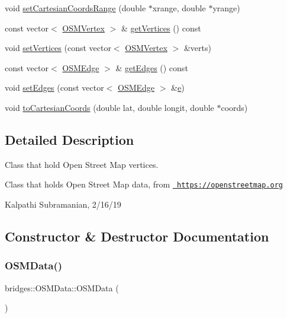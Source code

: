 \begin{DoxyCompactItemize}
\item 
void \mbox{\hyperlink{classbridges_1_1_o_s_m_data_ab61b84e459e01baa7f2c00da47ff4ccf}{set\+Cartesian\+Coords\+Range}} (double $\ast$xrange, double $\ast$yrange)
\item 
const vector$<$ \mbox{\hyperlink{classbridges_1_1_o_s_m_vertex}{O\+S\+M\+Vertex}} $>$ \& \mbox{\hyperlink{classbridges_1_1_o_s_m_data_a2f8fd5e4d3d0252ae7afae32f9ccc4fa}{get\+Vertices}} () const
\item 
void \mbox{\hyperlink{classbridges_1_1_o_s_m_data_aafb30f3266813b4ad8526312d4914f91}{set\+Vertices}} (const vector$<$ \mbox{\hyperlink{classbridges_1_1_o_s_m_vertex}{O\+S\+M\+Vertex}} $>$ \&verts)
\item 
const vector$<$ \mbox{\hyperlink{classbridges_1_1_o_s_m_edge}{O\+S\+M\+Edge}} $>$ \& \mbox{\hyperlink{classbridges_1_1_o_s_m_data_a0a226c840f69547f5d4e53dd7d4ef5d3}{get\+Edges}} () const
\item 
void \mbox{\hyperlink{classbridges_1_1_o_s_m_data_a3448ae401b5c5253262cc9c386dba1a9}{set\+Edges}} (const vector$<$ \mbox{\hyperlink{classbridges_1_1_o_s_m_edge}{O\+S\+M\+Edge}} $>$ \&\mbox{\hyperlink{namespacebridges_acfb0a4f7877d8f63de3e6862004c50edae1671797c52e15f763380b45e841ec32}{e}})
\item 
void \mbox{\hyperlink{classbridges_1_1_o_s_m_data_a30f6f5c0f20660fdb903bfe6fef4d4e0}{to\+Cartesian\+Coords}} (double lat, double longit, double $\ast$coords)
\end{DoxyCompactItemize}


\subsection{Detailed Description}
Class that hold Open Street Map vertices. 

Class that holds Open Street Map data, from \href{https://openstreetmap.org}{\texttt{ https\+://openstreetmap.\+org}}

Kalpathi Subramanian, 2/16/19 

\subsection{Constructor \& Destructor Documentation}
\mbox{\label{classbridges_1_1_o_s_m_data_a8abc19a052659621f74d7cbe354f90e9}} 
\subsubsection{\texorpdfstring{OSMData()}{OSMData()}}
{\footnotesize\ttfamily bridges\+::\+O\+S\+M\+Data\+::\+O\+S\+M\+Data (\begin{DoxyParamCaption}{ }\end{DoxyParamCaption})\hspace{0.3cm}{\ttfamily [inline]}}



